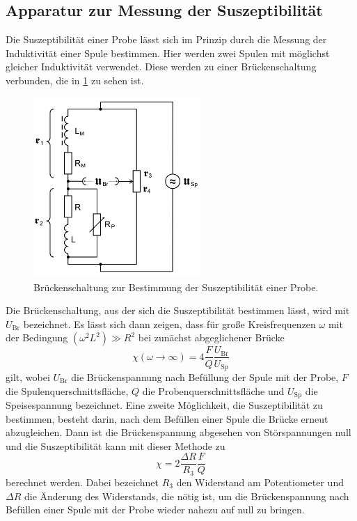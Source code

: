 \subsection{Apparatur zur Messung der Suszeptibilität}
\label{subsec:apparatur}

Die Suszeptibilität einer Probe lässt sich im Prinzip durch die Messung
der Induktivität einer Spule bestimmen. Hier werden zwei Spulen mit möglichst gleicher
Induktivität verwendet. Diese werden zu einer Brückenschaltung verbunden, die in \ref{fig:brueckenschaltung} zu sehen ist.

\begin{figure}[H]
  \centering
  \includegraphics[width=180pt]{data/bruecke.png}
  \caption{Brückenschaltung zur Bestimmung der Suszeptibilität einer Probe\cite{Versuchsanleitung}.}
  \label{fig:brueckenschaltung}
\end{figure}

Die Brückenschaltung, aus der sich die Suszeptibilität bestimmen lässt, wird mit $U_\text{Br}$ bezeichnet.
Es lässt sich dann zeigen, dass für große Kreisfrequenzen $\omega$ mit der Bedingung
$(\omega^2 L ^2) \gg R^2$ bei zunächst abgeglichener Brücke
\begin{equation}
  \chi(\omega \to \infty) = 4 \frac{F}{Q} \frac{U_\text{Br}}{U_\text{Sp}}
\end{equation}
gilt, wobei $U_\text{Br}$ die Brückenspannung nach Befüllung der Spule mit der Probe,
$F$ die Spulenquerschnittsfläche, $Q$ die Probenquerschnittsfläche und $U_\text{Sp}$ die Speisespannung bezeichnet.
Eine zweite Möglichkeit, die Suszeptibilität zu bestimmen, besteht darin, nach dem Befüllen
einer Spule die Brücke erneut abzugleichen. Dann ist die Brückenspannung abgesehen von Störspannungen
null und die Suszeptibilität kann mit dieser Methode zu
\begin{equation}
  \chi = 2 \frac{\Delta R}{R_3} \frac{F}{Q}
\end{equation}
berechnet werden. Dabei bezeichnet $R_3$ den Widerstand am Potentiometer und $\Delta R$
die Änderung des Widerstands, die nötig ist, um die Brückenspannung nach Befüllen
einer Spule mit der Probe wieder nahezu auf null zu bringen.

